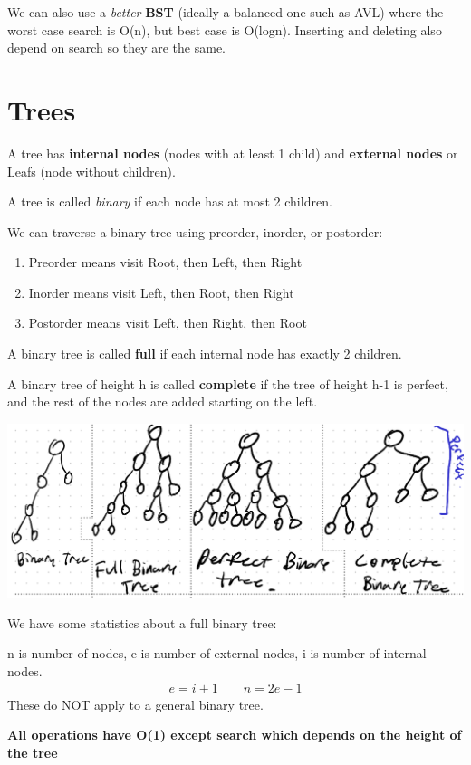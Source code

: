 \documentclass[12pt,letterpaper]{article} \usepackage{amsmath} \usepackage{graphicx} \usepackage[margin=1in]{geometry} \usepackage{longtable}  \usepackage{amssymb}
\begin{document}
	We can also use a \textit{better} \textbf{BST} (ideally a balanced one such as AVL) where the worst case search is O(n), but best case is O(logn). Inserting and deleting also depend on search so they are the same.
	
	\section{Trees}
	A tree has \textbf{internal nodes }(nodes with at least 1 child) and \textbf{external nodes }or Leafs (node without children).
	
	A tree is called \textit{binary} if each node has at most 2 children.
	
	We can traverse a binary tree using preorder, inorder, or postorder:
	\begin{enumerate}[noitemsep]
		\item Preorder means visit Root, then Left, then Right
		\item Inorder means visit Left, then Root, then Right
		\item Postorder means visit Left, then Right, then Root
	\end{enumerate}

	A binary tree is called \textbf{full} if each internal node has exactly 2 children.
	
	A binary tree of height h is called \textbf{complete} if the tree of height h-1 is perfect, and the rest of the nodes are added starting on the left.
	\begin{center}
		\includegraphics[width=0.8\linewidth]{trees}
	\end{center}

	We have some statistics about a full binary tree: 
	
	n is number of nodes, e is number of external nodes, i is number of internal nodes.
	\begin{align*}
		e = i+1\qquad n=2e-1
	\end{align*}
	These do NOT apply to a general binary tree.
	
	\textbf{All operations have O(1) except search which depends on the height of the tree}
	
\end{document}
